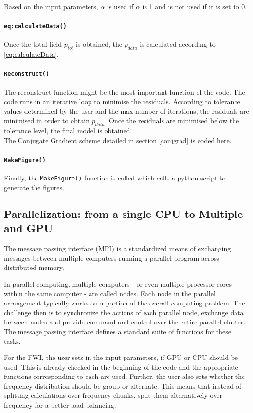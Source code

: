 \documentclass[10pt,a4paper]{article}
\begin{document}
Based on the input parameters, $\alpha$ is used
if $\alpha$ is 1 and is not used if it is set
to 0.

\paragraph{\texttt{eq:calculateData()}}
Once the total field $p_{tot}$ is obtained, the $p_{data}$ is
calculated according to \ref{eq:calculateData}.

\paragraph{\texttt{Reconstruct()}}
The reconstruct function might be the most important function of the
code. The code runs in an iterative loop to minimise the residuals.
According to tolerance values determined by the user and the max
number of iterations, the residuals are minimised in order to obtain
$p_{data}$. Once the residuals are minimised below the tolerance
level, the final model is obtained.\\

The Conjugate Gradient scheme detailed in section \ref{conjgrad} is coded here.

\paragraph{\texttt{MakeFigure()}}

Finally, the \texttt{MakeFigure()} function is called which calls a
python script to generate the figures.

\subsection{Parallelization: from a single CPU to Multiple and GPU}
The message passing interface (MPI) is a standardized means of
exchanging messages between multiple computers running a parallel
program across distributed memory.

In parallel computing, multiple computers - or even multiple processor
cores within the same computer - are called nodes.  Each node in the
parallel arrangement typically works on a portion of the overall
computing problem. The challenge then is to synchronize the actions of
each parallel node, exchange data between nodes and provide command
and control over the entire parallel cluster. The message passing
interface defines a standard suite of functions for these tasks.

For the FWI, the user sets in the input parameters, if GPU or CPU
should be used. This is already checked in the beginning of the code
and the appropriate functions corresponding to each are used. Further,
the user also sets whether the frequency distribution should be group
or alternate. This means that instead of splitting calculations over
frequency chunks, split them alternatively over frequency for a better
load balancing.
\end{document}
